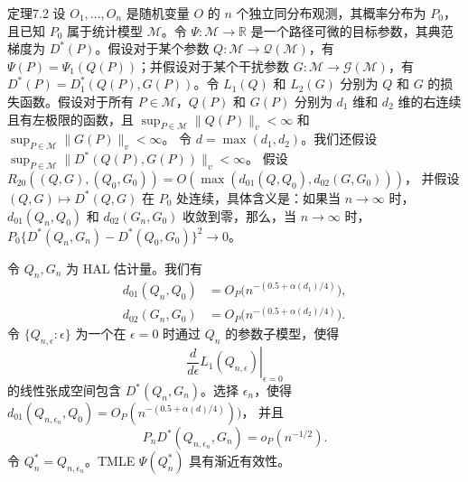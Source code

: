 \begin{bookresult}{定理}{7.2}
设 $O_1,\ldots,O_n$ 是随机变量 $O$ 的 $n$ 个独立同分布观测，其概率分布为 $P_0$，且已知 $P_0$ 属于统计模型 $\mathcal M$。令 $\Psi:\mathcal M\to\mathbb R$ 是一个路径可微的目标参数，其典范梯度为 $D^*(P)$。假设对于某个参数 $Q:\mathcal M\to\mathcal Q(\mathcal M)$，有 $\Psi(P)=\Psi_1(Q(P))$；并假设对于某个干扰参数 $G:\mathcal M\to\mathcal G(\mathcal M)$，有 $D^*(P)=D_1^*(Q(P),G(P))$。令 $L_1(Q)$ 和 $L_2(G)$ 分别为 $Q$ 和 $G$ 的损失函数。假设对于所有 $P\in\mathcal M$，$Q(P)$ 和 $G(P)$ 分别为 $d_1$ 维和 $d_2$ 维的右连续且有左极限的函数，且
$\sup_{P\in\mathcal M}\|Q(P)\|_v<\infty$
和
$\sup_{P\in\mathcal M}\|G(P)\|_v<\infty$。
令 $d=\max(d_1,d_2)$。我们还假设
$\sup_{P\in\mathcal M}\|D^*(Q(P),G(P))\|_v<\infty$。
假设
$R_{20}((Q,G),(Q_0,G_0))
 =O(\max(d_{01}(Q,Q_0),d_{02}(G,G_0)))$，
并假设 $(Q,G)\mapsto D^*(Q,G)$ 在 $P_0$ 处连续，具体含义是：如果当 $n\to\infty$ 时，$d_{01}(Q_n,Q_0)$ 和 $d_{02}(G_n,G_0)$ 收敛到零，那么，当 $n\to\infty$ 时，
$P_0\{D^*(Q_n,G_n)-D^*(Q_0,G_0)\}^2\to0$。

令 $Q_n,G_n$ 为 HAL 估计量。我们有
\[
 \begin{aligned}
 d_{01}(Q_n,Q_0)&=O_P\bigl(n^{-(0.5+\alpha(d_1)/4)}\bigr),\\
 d_{02}(G_n,G_0)&=O_P\bigl(n^{-(0.5+\alpha(d_2)/4)}\bigr).
 \end{aligned}
\]
令 $\{Q_{n,\epsilon}:\epsilon\}$ 为一个在 $\epsilon=0$ 时通过 $Q_n$ 的参数子模型，使得
\[
 \left.\frac{d}{d\epsilon}L_1(Q_{n,\epsilon})\right|_{\epsilon=0}
\]
的线性张成空间包含 $D^*(Q_n,G_n)$。选择 $\epsilon_n$，使得
$d_{01}(Q_{n,\epsilon_n},Q_0)
 =O_P(n^{-(0.5+\alpha(d)/4)}))$，
并且
\[
 P_nD^*(Q_{n,\epsilon_n},G_n)=o_P(n^{-1/2}).
\]
令 $Q_n^*=Q_{n,\epsilon_n}$。TMLE $\Psi(Q_n^*)$ 具有渐近有效性。
\end{bookresult}

